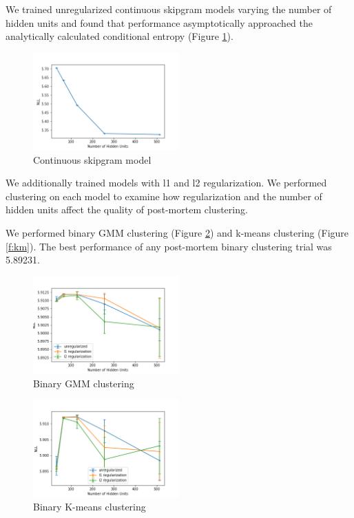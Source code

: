 \documentclass[11pt,letterpaper]{article}
\begin{document}
We trained unregularized continuous skipgram models varying the number of hidden units and found that performance asymptotically approached the analytically calculated conditional entropy (Figure \ref{f:baseline}). 

\begin{figure}
  \caption{Continuous skipgram model}
\label{f:baseline}
  \centering
    \includegraphics[width=0.5\textwidth]{baseline.png}
\end{figure}

We additionally trained models with l1 and l2 regularization. We performed clustering on each model to examine how regularization and the number of hidden units affect the quality of post-mortem clustering. 

We performed binary GMM clustering (Figure \ref{f:bgmm}) and k-means clustering (Figure \ref{f:km}). The best performance of any post-mortem binary clustering trial was 5.89231.

\begin{figure}
  \caption{Binary GMM clustering}
\label{f:bgmm}
  \centering
    \includegraphics[width=0.5\textwidth]{binary_gmm.png}
\end{figure}


\begin{figure}
  \caption{Binary K-means clustering}
\label{f:bkm}
  \centering
    \includegraphics[width=0.5\textwidth]{binary_km.png}
\end{figure}
\end{document}

